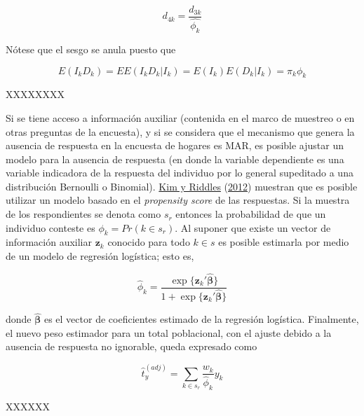 \documentclass[
  12pt,
  spanish,
]{book}
\begin{document}
\[
d_{4k} = \frac{d_{3k}}{\hat{\phi_k}}
\]

Nótese que el sesgo se anula puesto que

\[
E(I_kD_k) 
= EE(I_kD_k|I_k) 
= E(I_k)E(D_k|I_k) = \pi_k \phi_k
\]

XXXXXXXX

Si se tiene acceso a información auxiliar (contenida en el marco de muestreo o en otras preguntas de la encuesta), y si se considera que el mecanismo que genera la ausencia de respuesta en la encuesta de hogares es MAR, es posible ajustar un modelo para la ausencia de respuesta (en donde la variable dependiente es una variable indicadora de la respuesta del individuo por lo general supeditado a una distribución Bernoulli o Binomial). \protect\hyperlink{ref-Kim_Riddles_2012}{Kim y Riddles} (\protect\hyperlink{ref-Kim_Riddles_2012}{2012}) muestran que es posible utilizar un modelo basado en el \emph{propensity score} de las respuestas. Si la muestra de los respondientes se denota como \(s_r\) entonces la probabilidad de que un individuo conteste es \(\phi_k = Pr(k \in s_r)\). Al suponer que existe un vector de información auxiliar \(\mathbf{z}_k\) conocido para todo \(k\in s\) es posible estimarla por medio de un modelo de regresión logística; esto es,

\[
\hat{\phi}_k = \frac{\exp\{\mathbf{z}_k'\hat{\boldsymbol{\beta}}\}}{1 + \exp\{\mathbf{z}_k'\hat{\boldsymbol{\beta}}\}}
\]

donde \(\hat{\mathbf{\beta}}\) es el vector de coeficientes estimado de la regresión logística. Finalmente, el nuevo peso estimador para un total poblacional, con el ajuste debido a la ausencia de respuesta no ignorable, queda expresado como

\[
\hat{t}_{y}^{(adj)}= \sum_{k\in s_r} \frac{w_k}{\hat{\phi}_k}y_k
\]

XXXXXX
\end{document}
